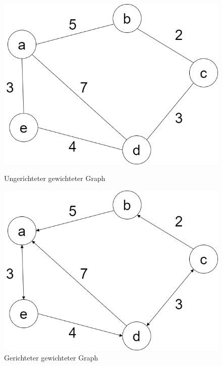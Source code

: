 \begin{figure}[!tbp]
	\centering
	\begin{minipage}[b]{0.45\textwidth}
		\includegraphics[width=\linewidth]{images/undirGraph.png}
		\caption{Ungerichteter gewichteter Graph}
		\label{fig:undirGraph}
	\end{minipage}
	\hfill
	\begin{minipage}[b]{0.45\textwidth}
		\includegraphics[width=\linewidth]{images/dirGraph.png}
		\caption{Gerichteter gewichteter Graph}
		\label{fig:dirGraph}
	\end{minipage}
\end{figure}